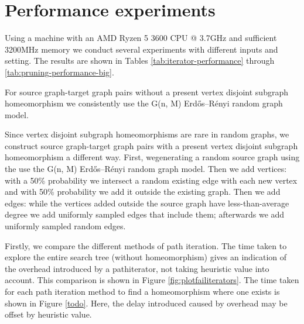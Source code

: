 \chapter{Performance experiments}
Using a machine with an AMD Ryzen 5 3600 CPU @ 3.7GHz and sufficient 3200MHz memory we conduct several experiments with different inputs and setting. The results are shown in Tables \ref{tab:iterator-performance} through \ref{tab:pruning-performance-big}. 

For source graph-target graph pairs without a present vertex disjoint subgraph homeomorphism we consistently use the G(n, M) Erdős–Rényi random graph model.

Since vertex disjoint subgraph homeomorphisms are rare in random graphs, we construct source graph-target graph pairs with a present vertex disjoint subgraph homeomorphism a different way. First, wegenerating a random source graph using the use the G(n, M) Erdős–Rényi random graph model. Then we add vertices: with a 50\% probability we intersect a random existing edge with each new vertex and with 50\% probability we add it outside the existing graph. Then we add edges: while the vertices added outside the source graph have less-than-average degree we add uniformly sampled edges that include them; afterwards we add uniformly sampled random edges.

Firstly, we compare the different methods of path iteration. The time taken to explore the entire search tree (without homeomorphism) gives an indication of the overhead introduced by a pathiterator, not taking heuristic value into account. This comparison is shown in Figure \ref{fig:plotfailiterators}. The time taken for each path iteration method to find a homeomorphism where one exists is shown in Figure \ref{todo}. Here, the delay introduced caused by overhead may be offset by heuristic value.





